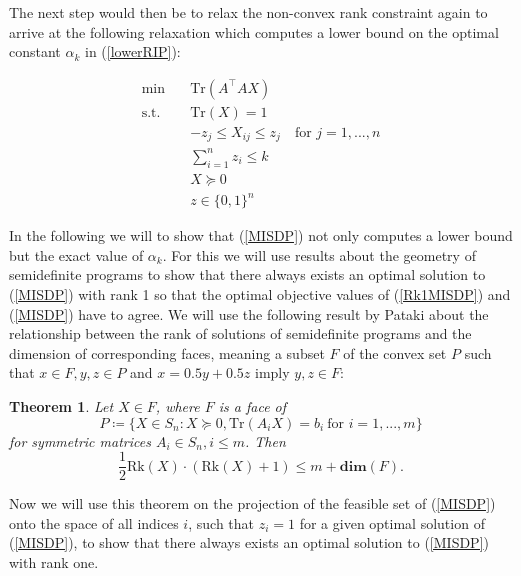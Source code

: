 \documentclass[journal]{IEEEtran}
\newtheorem{theorem}{Theorem}
\newcommand{\define}{\coloneqq}
\newcommand{\T}{^{\top}}
\newcommand{\Tr}{\text{Tr}}
\newcommand{\Rk}{\text{Rk}}
\begin{document}
The next step would then be to relax the non-convex rank constraint again to arrive at the following relaxation which computes a lower bound on the optimal constant $\alpha_k$ in (\ref{lowerRIP}):

\begin{align}\label{MISDP}
 \min \quad & \Tr(A\T A X) \nonumber \\
 \text{s.t.} \quad & \Tr(X) = 1 \nonumber \\
 & -z_j \leq X_{ij} \leq z_j \quad \text{for } j = 1, ..., n \nonumber \\
 & \sum_{i=1}^n z_i \leq k \tag{MISDP} \\
 & X \succeq 0  \nonumber \\
 & z \in \{0,1\}^n \nonumber
\end{align}

In the following we will to show that (\ref{MISDP}) not only computes a lower bound but the exact value of $\alpha_k$. For this we will use results about the geometry of semidefinite programs to show that there always exists an 
optimal solution to (\ref{MISDP}) with rank 1 so that the optimal objective values of (\ref{Rk1MISDP}) and (\ref{MISDP}) have to agree. We will use the following result by Pataki \cite{pat98} about the relationship between the rank of
solutions of semidefinite programs and the dimension of corresponding faces, meaning a subset $F$ of the convex set $P$ such that \mbox{$x \in F, y, z \in P$} and $x = 0.5y + 0.5z$ imply $y,z \in F$:

\begin{theorem}\label{patakiLemma}
 Let $X \in F$, where $F$ is a face of
 \begin{equation*}
 P \define \{X \in S_n : X \succeq 0, \Tr(A_i X) = b_i \ \text{for } i = 1, ..., m\}
 \end{equation*}
 for symmetric matrices $A_i \in S_n, i \leq m$. Then
 \begin{equation*}
  \frac{1}{2}\Rk(X)\cdot(\Rk(X)+1) \leq m + \textbf{dim}(F).
 \end{equation*}
\end{theorem}

Now we will use this theorem on the projection of the feasible set of (\ref{MISDP}) onto the space of all indices $i$, such that $z_i = 1$ for a given optimal solution of (\ref{MISDP}), to show that there always exists an optimal 
solution to (\ref{MISDP}) with rank one.
\end{document}
